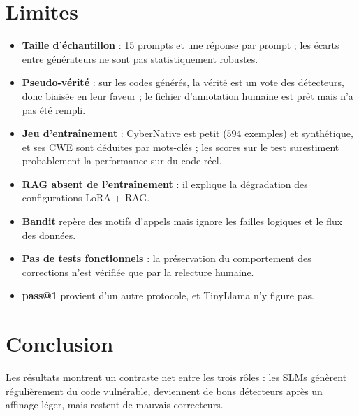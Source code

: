 \documentclass[11pt,a4paper,oneside]{report}
\newcommand{\chapconclusion}{\section*{Conclusion}}
\begin{document}
\section{Limites}
\begin{itemize}
  \item \textbf{Taille d'échantillon} : 15 prompts et une réponse par prompt ; les écarts entre générateurs ne sont pas statistiquement robustes.
  \item \textbf{Pseudo-vérité} : sur les codes générés, la vérité est un vote des détecteurs, donc biaisée en leur faveur ; le fichier d'annotation humaine est prêt mais n'a pas été rempli.
  \item \textbf{Jeu d'entraînement} : CyberNative est petit (594 exemples) et synthétique, et ses CWE sont déduites par mots-clés ; les scores sur le test surestiment probablement la performance sur du code réel.
  \item \textbf{RAG absent de l'entraînement} : il explique la dégradation des configurations LoRA + RAG.
  \item \textbf{Bandit} repère des motifs d'appels mais ignore les failles logiques et le flux des données.
  \item \textbf{Pas de tests fonctionnels} : la préservation du comportement des corrections n'est vérifiée que par la relecture humaine.
  \item \textbf{pass@1} provient d'un autre protocole, et TinyLlama n'y figure pas.
\end{itemize}

\chapconclusion
Les résultats montrent un contraste net entre les trois rôles : les SLMs génèrent régulièrement du code vulnérable, deviennent de bons détecteurs après un affinage léger, mais restent de mauvais correcteurs.

\end{document}
